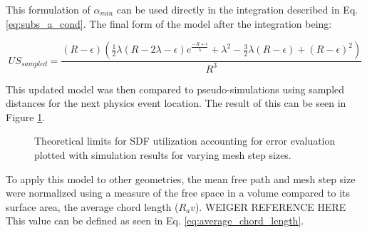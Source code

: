 This formulation of $\alpha_{min}$ can be used directly in the integration described
in Eq. \ref{eq:subs_a_cond}. The final form of the model after the integration being:

$$ US_{sampled} = \frac{(R-\epsilon) (\frac{1}{2} \lambda ( R - 2\lambda - \epsilon ) e^{\frac{-R + \epsilon}{\lambda}} +
\lambda^{2} - \frac{3}{2}\lambda(R - \epsilon) + (R-\epsilon)^{2})}{R^3}$$




This updated model was then compared to pseudo-simulations using sampled
distances for the next physics event location. The result of this can be seen in
Figure \ref{fig:sdf_util_sampled_distance_w_error}.

\begin{figure}[ht]
  \centering
  {\textwidth}
  \caption{Theoretical limits for SDF utilization accounting for error
    evaluation plotted with simulation results for varying mesh step sizes.}
  \label{fig:sdf_util_sampled_distance_w_error}
\end{figure}

To apply this model to other geometries, the mean free path and mesh step size
were normalized using a measure of the free space in a volume compared to its
surface area, the average chord length ($R_av$). WEIGER REFERENCE HERE  This value can be defined as
seen in Eq. \ref{eq:average_chord_length}.




